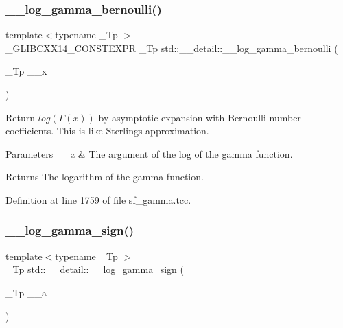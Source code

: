 \subsubsection{\texorpdfstring{\+\_\+\+\_\+log\+\_\+gamma\+\_\+bernoulli()}{\_\_log\_gamma\_bernoulli()}}
{\footnotesize\ttfamily template$<$typename \+\_\+\+Tp $>$ \\
\+\_\+\+G\+L\+I\+B\+C\+X\+X14\+\_\+\+C\+O\+N\+S\+T\+E\+X\+PR \+\_\+\+Tp std\+::\+\_\+\+\_\+detail\+::\+\_\+\+\_\+log\+\_\+gamma\+\_\+bernoulli (\begin{DoxyParamCaption}\item[{\+\_\+\+Tp}]{\+\_\+\+\_\+x }\end{DoxyParamCaption})}



Return $log(\Gamma(x))$ by asymptotic expansion with Bernoulli number coefficients. This is like Sterling\textquotesingle{}s approximation. 


\begin{DoxyParams}{Parameters}
{\em \+\_\+\+\_\+x} & The argument of the log of the gamma function. \\
\hline
\end{DoxyParams}
\begin{DoxyReturn}{Returns}
The logarithm of the gamma function. 
\end{DoxyReturn}


Definition at line 1759 of file sf\+\_\+gamma.\+tcc.

\mbox{\label{namespacestd_1_1____detail_ab17ef141874b20a302d5c142cf304542}} 
\subsubsection{\texorpdfstring{\+\_\+\+\_\+log\+\_\+gamma\+\_\+sign()}{\_\_log\_gamma\_sign()}\hspace{0.1cm}{\footnotesize\ttfamily [1/2]}}
{\footnotesize\ttfamily template$<$typename \+\_\+\+Tp $>$ \\
\+\_\+\+Tp std\+::\+\_\+\+\_\+detail\+::\+\_\+\+\_\+log\+\_\+gamma\+\_\+sign (\begin{DoxyParamCaption}\item[{\+\_\+\+Tp}]{\+\_\+\+\_\+a }\end{DoxyParamCaption})}



